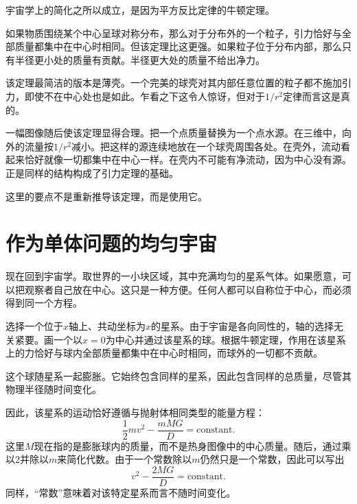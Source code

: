 宇宙学上的简化之所以成立，是因为平方反比定律的牛顿定理。

如果物质围绕某个中心呈球对称分布，那么对于分布外的一个粒子，引力恰好与全部质量都集中在中心时相同。但该定理比这更强。如果粒子位于分布内部，那么只有半径更小处的质量有贡献。半径更大处的质量不给出净力。

该定理最简洁的版本是薄壳。一个完美的球壳对其内部任意位置的粒子都不施加引力，即使不在中心处也是如此。乍看之下这令人惊讶，但对于\(1/r^2\)定律而言这是真的。

\begin{classroomqa}
\end{classroomqa}

一幅图像随后使该定理显得合理。把一个点质量替换为一个点水源。在三维中，向外的流量按\(1/r^2\)减小。把这样的源连续地放在一个球壳周围各处。在壳外，流动看起来恰好就像一切都集中在中心一样。在壳内不可能有净流动，因为中心没有源。正是同样的结构构成了引力定理的基础。

这里的要点不是重新推导该定理，而是使用它。

\section{作为单体问题的均匀宇宙}

现在回到宇宙学。取世界的一小块区域，其中充满均匀的星系气体。如果愿意，可以把观察者自己放在中心。这只是一种方便。任何人都可以自称位于中心，而必须得到同一个方程。

选择一个位于\(x\)轴上、共动坐标为\(x\)的星系。由于宇宙是各向同性的，轴的选择无关紧要。画一个以\(x=0\)为中心并通过该星系的球。根据牛顿定理，作用在该星系上的力恰好与球内全部质量都集中在中心时相同，而球外的一切都不贡献。

这个球随星系一起膨胀。它始终包含同样的星系，因此包含同样的总质量，尽管其物理半径随时间变化。

因此，该星系的运动恰好遵循与抛射体相同类型的能量方程：
\begin{equation}
\frac{1}{2}mv^2-\frac{mMG}{D}=\text{constant}.
\end{equation}
这里\(M\)现在指的是膨胀球内的质量，而不是热身图像中的中心质量。随后，通过乘以\(2\)并除以\(m\)来简化代数。由于一个常数除以\(m\)仍然只是一个常数，因此可以写出
\begin{equation}
v^2-\frac{2MG}{D}=\text{constant}.
\end{equation}
同样，``常数''意味着对该特定星系而言不随时间变化。


